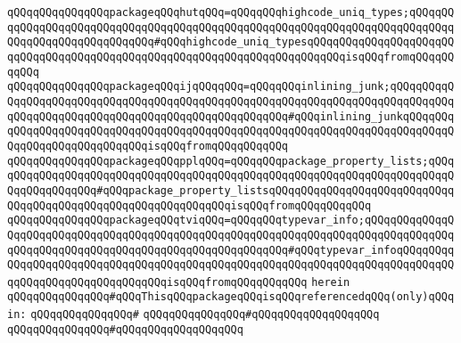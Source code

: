\verb|qQQqqQQqqQQqqQQqpackageqQQqhutqQQq=qQQqqQQqhighcode_uniq_types;qQQqqQQqqQQqqQQqqQQqqQQqqQQqqQQqqQQqqQQqqQQqqQQqqQQqqQQqqQQqqQQqqQQqqQQqqQQqqQQqqQQqqQQqqQQqqQQqqQQq#qQQqhighcode_uniq_typesqQQqqQQqqQQqqQQqqQQqqQQqqQQqqQQqqQQqqQQqqQQqqQQqqQQqqQQqqQQqqQQqqQQqqQQqqQQqisqQQqfromqQQqqQQqqQQq|\newline
\verb|qQQqqQQqqQQqqQQqpackageqQQqijqQQqqQQq=qQQqqQQqinlining_junk;qQQqqQQqqQQqqQQqqQQqqQQqqQQqqQQqqQQqqQQqqQQqqQQqqQQqqQQqqQQqqQQqqQQqqQQqqQQqqQQqqQQqqQQqqQQqqQQqqQQqqQQqqQQqqQQqqQQqqQQqqQQq#qQQqinlining_junkqQQqqQQqqQQqqQQqqQQqqQQqqQQqqQQqqQQqqQQqqQQqqQQqqQQqqQQqqQQqqQQqqQQqqQQqqQQqqQQqqQQqqQQqqQQqqQQqqQQqisqQQqfromqQQqqQQqqQQq|\newline
\verb|qQQqqQQqqQQqqQQqpackageqQQqpplqQQq=qQQqqQQqpackage_property_lists;qQQqqQQqqQQqqQQqqQQqqQQqqQQqqQQqqQQqqQQqqQQqqQQqqQQqqQQqqQQqqQQqqQQqqQQqqQQqqQQqqQQqqQQq#qQQqpackage_property_listsqQQqqQQqqQQqqQQqqQQqqQQqqQQqqQQqqQQqqQQqqQQqqQQqqQQqqQQqqQQqqQQqisqQQqfromqQQqqQQqqQQq|\newline
\verb|qQQqqQQqqQQqqQQqpackageqQQqtviqQQq=qQQqqQQqtypevar_info;qQQqqQQqqQQqqQQqqQQqqQQqqQQqqQQqqQQqqQQqqQQqqQQqqQQqqQQqqQQqqQQqqQQqqQQqqQQqqQQqqQQqqQQqqQQqqQQqqQQqqQQqqQQqqQQqqQQqqQQqqQQqqQQq#qQQqtypevar_infoqQQqqQQqqQQqqQQqqQQqqQQqqQQqqQQqqQQqqQQqqQQqqQQqqQQqqQQqqQQqqQQqqQQqqQQqqQQqqQQqqQQqqQQqqQQqqQQqqQQqqQQqisqQQqfromqQQqqQQqqQQq|\newline
\verb|herein|\newline
\newline
\verb|qQQqqQQqqQQqqQQq#qQQqThisqQQqpackageqQQqisqQQqreferencedqQQq(only)qQQqin:|\newline
\verb|qQQqqQQqqQQqqQQq#|\newline
\verb|qQQqqQQqqQQqqQQq#qQQqqQQqqQQqqQQqqQQq|\newline
\verb|qQQqqQQqqQQqqQQq#qQQqqQQqqQQqqQQqqQQq|\newline
